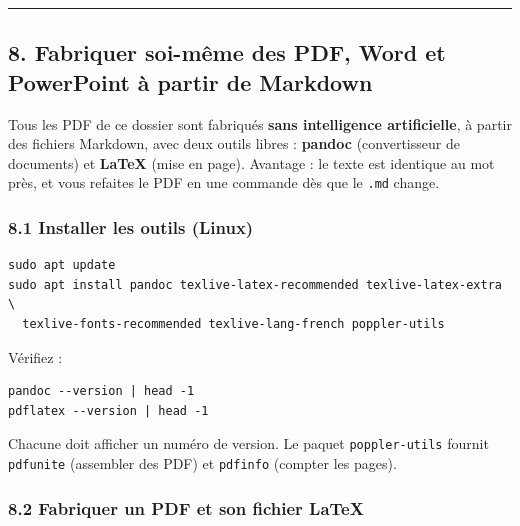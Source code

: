 \documentclass[
  french,
  11pt,
  a4paper,
]{article}
\begin{document}
\begin{center}\rule{0.5\linewidth}{0.5pt}\end{center}

\subsection{8. Fabriquer soi-même des PDF, Word et PowerPoint à partir
de
Markdown}\label{8-fabriquer-soi-muxeame-des-pdf-word-et-powerpoint-uxe0-partir-de-markdown}

Tous les PDF de ce dossier sont fabriqués \textbf{sans intelligence
artificielle}, à partir des fichiers Markdown, avec deux outils libres :
\textbf{pandoc} (convertisseur de documents) et \textbf{LaTeX} (mise en
page). Avantage : le texte est identique au mot près, et vous refaites
le PDF en une commande dès que le \texttt{.md} change.

\subsubsection{8.1 Installer les outils
(Linux)}\label{81-installer-les-outils-linux}

\begin{Verbatim}[breaklines=true,breakanywhere=true,fontsize=\small,frame=leftline,framerule=1.6pt,rulecolor=\color{credixblue},framesep=3mm,xleftmargin=2mm,xrightmargin=1mm]
sudo apt update
sudo apt install pandoc texlive-latex-recommended texlive-latex-extra \
  texlive-fonts-recommended texlive-lang-french poppler-utils
\end{Verbatim}

Vérifiez :

\begin{Verbatim}[breaklines=true,breakanywhere=true,fontsize=\small,frame=leftline,framerule=1.6pt,rulecolor=\color{credixblue},framesep=3mm,xleftmargin=2mm,xrightmargin=1mm]
pandoc --version | head -1
pdflatex --version | head -1
\end{Verbatim}

Chacune doit afficher un numéro de version. Le paquet
\texttt{poppler-utils} fournit \texttt{pdfunite} (assembler des PDF) et
\texttt{pdfinfo} (compter les pages).

\subsubsection{8.2 Fabriquer un PDF et son fichier
LaTeX}\label{82-fabriquer-un-pdf-et-son-fichier-latex}
\end{document}
